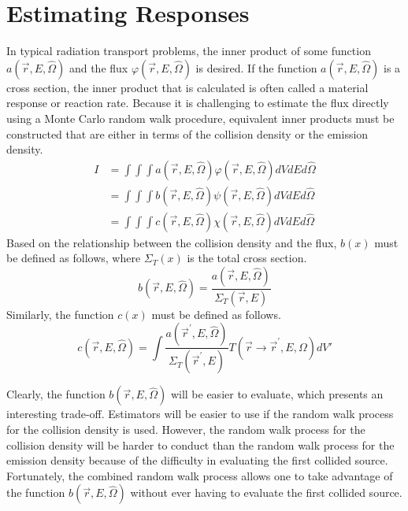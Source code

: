 \section{Estimating Responses}
In typical radiation transport problems, the inner product of some 
function $a(\vec{r},E,\hat{\Omega})$ and the flux 
$\varphi(\vec{r},E,\hat{\Omega})$ is desired. If the function 
$a(\vec{r},E,\hat{\Omega})$ is a cross section, the inner product that is 
calculated is often called a material response or reaction rate. Because it is 
challenging to estimate the flux directly using a Monte Carlo random walk 
procedure, equivalent inner products must be constructed that are either in 
terms of the collision density or the emission density. 
\begin{align}
  I & = \int\int\int a(\vec{r},E,\hat{\Omega}) \varphi(\vec{r},E,\hat{\Omega}) 
  dVdEd\hat{\Omega} \\
  & = \int\int\int b(\vec{r},E,\hat{\Omega}) \psi(\vec{r},E,\hat{\Omega})  
  dVdEd\hat{\Omega} \\
  & = \int\int\int c(\vec{r},E,\hat{\Omega}) \chi(\vec{r},E,\hat{\Omega}) 
  dVdEd\hat{\Omega}
\end{align}
Based on the relationship between the collision density and the flux, $b(x)$
must be defined as follows, where $\Sigma_T(x)$ is the total cross section.
\begin{equation}
  b(\vec{r},E,\hat{\Omega}) = \frac{a(\vec{r},E,\hat{\Omega})}
  {\Sigma_T(\vec{r},E)}
  \label{eq:collision_response_function}
\end{equation}
Similarly, the function $c(x)$ must be defined as follows.
\begin{equation}
  c(\vec{r},E,\hat{\Omega}) = \int \frac{a(\vec{r}^{'},E,\hat{\Omega})}
  {\Sigma_T(\vec{r}^{'},E)} T(\vec{r} \to \vec{r}^{'},E,\Omega)dV'
  \label{eq:emission_response_function}
\end{equation}

Clearly, the function $b(\vec{r},E,\hat{\Omega})$ will be easier to evaluate, 
which presents an interesting trade-off. Estimators will be easier to use if 
the random walk process for the collision density is used. However, the random 
walk process for the collision density will be harder to conduct than the 
random walk process for the emission density because of the difficulty in 
evaluating the first collided source. Fortunately, the combined random walk 
process allows one to take advantage of the function 
$b(\vec{r},E,\hat{\Omega})$ without ever having to evaluate the first collided 
source. 

